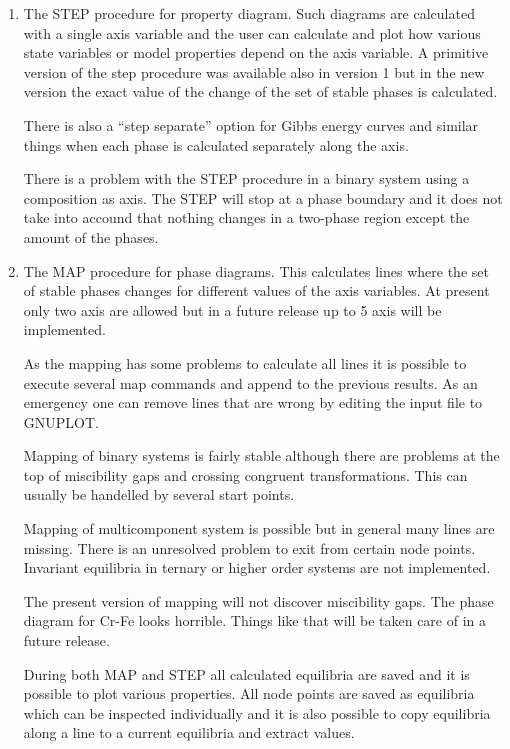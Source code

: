 \documentclass[12pt]{article}
\begin{document}
\begin{enumerate}
\item The STEP procedure for property diagram.  Such diagrams are
  calculated with a single axis variable and the user can calculate
  and plot how various state variables or model properties depend on
  the axis variable.  A primitive version of the step procedure was
  available also in version 1 but in the new version the exact value
  of the change of the set of stable phases is calculated.

  There is also a ``step separate'' option for Gibbs energy curves and
  similar things when each phase is calculated separately along the
  axis.

  There is a problem with the STEP procedure in a binary system using
  a composition as axis.  The STEP will stop at a phase boundary and
  it does not take into accound that nothing changes in a two-phase
  region except the amount of the phases.

\item The MAP procedure for phase diagrams.  This calculates lines
  where the set of stable phases changes for different values of the
  axis variables.  At present only two axis are allowed but in a
  future release up to 5 axis will be implemented.

  As the mapping has some problems to calculate all lines it is
  possible to execute several map commands and append to the previous
  results.  As an emergency one can remove lines that are wrong by
  editing the input file to GNUPLOT.

  Mapping of binary systems is fairly stable although there are
  problems at the top of miscibility gaps and crossing congruent
  transformations.  This can usually be handelled by several start
  points.

  Mapping of multicomponent system is possible but in general many
  lines are missing.  There is an unresolved problem to exit from
  certain node points.  Invariant equilibria in ternary or higher
  order systems are not implemented.

  The present version of mapping will not discover miscibility gaps.
  The phase diagram for Cr-Fe looks horrible.  Things like that will
  be taken care of in a future release.

  During both MAP and STEP all calculated equilibria are saved and it
  is possible to plot various properties.  All node points are saved
  as equilibria which can be inspected individually and it is also
  possible to copy equilibria along a line to a current equilibria and
  extract values.


\end{enumerate}
\end{document}
